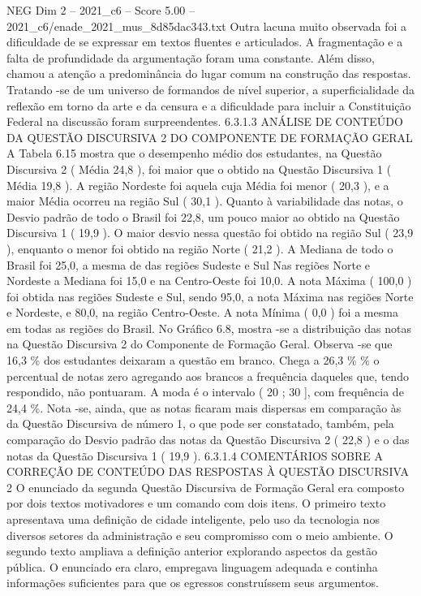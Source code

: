 \begin{textsample}{NEG Dim 2 – 2021\_c6 – Score 5.00 – 2021\_c6/enade\_2021\_mus\_8d85dac343.txt}
Outra lacuna muito observada foi a dificuldade de se expressar em textos fluentes e articulados.
A fragmentação e a falta de profundidade da argumentação foram uma constante.
Além disso, chamou a atenção a predominância do lugar comum na construção das respostas.
Tratando -se de um universo de formandos de nível superior, a superficialidade da reflexão em torno da arte e da censura e a dificuldade para incluir a Constituição Federal na discussão foram surpreendentes. 6.3.1.3 ANÁLISE DE CONTEÚDO DA QUESTÃO DISCURSIVA 2 DO COMPONENTE DE FORMAÇÃO GERAL A Tabela 6.15 mostra que o desempenho médio dos estudantes, na Questão Discursiva 2 ( Média 24,8 ), foi maior que o obtido na Questão Discursiva 1 ( Média 19,8 ).
A região Nordeste foi aquela cuja Média foi menor ( 20,3 ), e a maior Média ocorreu na região Sul ( 30,1 ).
Quanto à variabilidade das notas, o Desvio padrão de todo o Brasil foi 22,8, um pouco maior ao obtido na Questão Discursiva 1 ( 19,9 ).
O maior desvio nessa questão foi obtido na região Sul ( 23,9 ), enquanto o menor foi obtido na região Norte ( 21,2 ).
A Mediana de todo o Brasil foi 25,0, a mesma de das regiões Sudeste e Sul Nas regiões Norte e Nordeste a Mediana foi 15,0 e na Centro-Oeste foi 10,0.
A nota Máxima ( 100,0 ) foi obtida nas regiões Sudeste e Sul, sendo 95,0, a nota Máxima nas regiões Norte e Nordeste, e 80,0, na região Centro-Oeste.
A nota Mínima ( 0,0 ) foi a mesma em todas as regiões do Brasil.
No Gráfico 6.8, mostra -se a distribuição das notas na Questão Discursiva 2 do Componente de Formação Geral.
Observa -se que 16,3 \% dos estudantes deixaram a questão em branco.
Chega a 26,3 \% \% o percentual de notas zero agregando aos brancos a frequência daqueles que, tendo respondido, não pontuaram.
A moda é o intervalo ( 20 ; 30 ], com frequência de 24,4 \%.
Nota -se, ainda, que as notas ficaram mais dispersas em comparação às da Questão Discursiva de número 1, o que pode ser constatado, também, pela comparação do Desvio padrão das notas da Questão Discursiva 2 ( 22,8 ) e o das notas da Questão Discursiva 1 ( 19,9 ). 6.3.1.4 COMENTÁRIOS SOBRE A CORREÇÃO DE CONTEÚDO DAS RESPOSTAS À QUESTÃO DISCURSIVA 2 O enunciado da segunda Questão Discursiva de Formação Geral era composto por dois textos motivadores e um comando com dois itens.
O primeiro texto apresentava uma definição de cidade inteligente, pelo uso da tecnologia nos diversos setores da administração e seu compromisso com o meio ambiente.
O segundo texto ampliava a definição anterior explorando aspectos da gestão pública.
O enunciado era claro, empregava linguagem adequada e continha informações suficientes para que os egressos construíssem seus argumentos.

\end{textsample}
